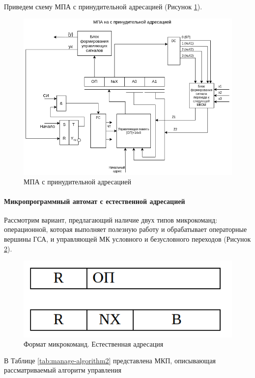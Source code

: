 \documentclass[a4paper,14pt]{extarticle}
\begin{document}
Приведем схему МПА с принудительной адресацией (Рисунок \ref{fig:straight-scheme}).
\begin{figure}[h!]
	\centering
	\includegraphics[width=0.7\linewidth]{images/straight-scheme}
	\caption{МПА с принудительной адресацией}
	\label{fig:straight-scheme}
\end{figure}


\newpage
\paragraph{Микропрограммный автомат с естественной адресацией}
Рассмотрим вариант, предлагающий наличие двух типов микрокоманд: операционной, которая выполняет полезную работу и обрабатывает операторные
вершины ГСА, и управляющей МК условного и безусловного переходов (Рисунок \ref{fig:mk-mix-nat}).

\begin{figure}[h!]
	\centering
	\includegraphics[width=0.4\linewidth]{images/mk-mix-nat}
	\caption{Формат микрокоманд. Естественная адресация}
	\label{fig:mk-mix-nat}
\end{figure}


В Таблице \ref{tab:manage-algorithm2} представлена МКП, описывающая рассматриваемый алгоритм управления
\end{document}
